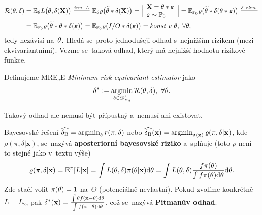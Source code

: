 \begin{dusl}
	\[
	\begin{split}
	\RF(\t,\delta)&=\E_\t L\big(\t,\delta(\textbf{X})\big)\equal{inv.~L}\E_\t\rho\big(\widetilde{\t}\ast\delta(\textbf{X})\big)=\Big|\begin{array}{l}
	\textbf{X}=\t\ast\boldsymbol{\epsilon}\\\boldsymbol{\epsilon}\sim\PP_0	
	\end{array}
	\Big|=\E_{\PP_0}\rho\big(\widetilde{\t}\ast\delta(\t\ast\boldsymbol{\epsilon})\big)\equal{\delta~ekvi.}\\&=\E_{\PP_0}\rho\big(\widetilde{\t}\ast\t\ast\delta(\boldsymbol{\epsilon})\big)=\E_{\PP_0}\rho\big(I/O\ast\delta(\boldsymbol{\epsilon})\big)=konst~v~\t,~\forall\t,
	\end{split}
	\]
	tedy nezávisí na~$\theta$. Hledá se~proto jednodušeji odhad s~nejnižším rizikem (mezi ekvivariantními). Vezme se~taková odhad, který má nejnižší hodnotu rizikové funkce. 
\end{dusl}
\begin{define}
	Definujeme MRE$_q$E \textit{Minimum risk equivariant estimator} jako $$ \delta^\ast:=\mathop{\mathrm{argmin}}_{\delta\in\mathscr{D}' _{Eq}}\mathcal{R}(\theta,\delta),~\forall\theta.$$
\end{define}
Takový odhad ale nemusí být přípustný a~nemusí ani existovat. 

\begin{remark}
	Bayesovské řešení $\widehat{\delta_\mathrm{B}}=\mathop{\mathrm{argmin}}_\delta r(\pi,\delta)$ nebo $\widehat{\delta_\mathrm{B}}(\textbf{x})= \mathop{\mathrm{argmin}}_{\delta(\textbf{x})}\varrho(\pi,\delta|\textbf{x})$, kde $\rho(\pi,\delta|\textbf{x})$, se~nazývá \textbf{aposteriorní bayesovské riziko} a~splňuje (toto $\rho$ není to stejné jako v~textu výše) 
	$$ \varrho(\pi,\delta|\textbf{x})=\mathbb{E}^\pi[L|\textbf{x}]=\int L(\theta,\delta)\pi(\theta|\textbf{x})\mathrm{d}\theta=\int L(\theta,\delta)\frac{f \pi(\theta)}{\int f \pi(\theta)\mathrm{d}\theta}\mathrm{d}\theta.$$
	Zde stačí volit $\pi(\theta)=1$ na~$\Theta$ (potenciálně nevlastní). Pokud zvolíme konkrétně $L=L_2$, pak $\delta^\ast(\textbf{x})=\frac{\int\theta f(\textbf{x}-\theta)\mathrm{d}\theta}{\int f(\textbf{x}-\theta)\mathrm{d}\theta}$, což se~nazývá \textbf{Pitmanův odhad}.
\end{remark}

